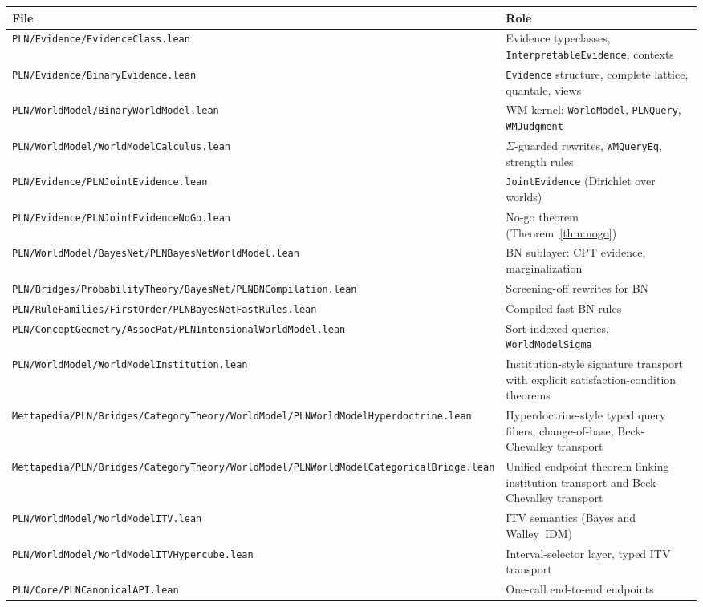 \documentclass[]{article}
\newcommand{\code}[1]{\texttt{#1}}
\begin{document}
\begin{longtable}{p{}p{}}
\hline
\textbf{File} & \textbf{Role} \\ \hline
\endhead
\code{PLN/Evidence/EvidenceClass.lean} & Evidence typeclasses,
  \code{InterpretableEvidence}, contexts \\
\code{PLN/Evidence/BinaryEvidence.lean} & \code{Evidence} structure, complete
  lattice, quantale, views \\
\code{PLN/WorldModel/BinaryWorldModel.lean} & WM kernel: \code{WorldModel},
  \code{PLNQuery}, \code{WMJudgment} \\
\code{PLN/WorldModel/WorldModelCalculus.lean} & $\Sigma$-guarded rewrites,
  \code{WMQueryEq}, strength rules \\
\code{PLN/Evidence/PLNJointEvidence.lean} & \code{JointEvidence} (Dirichlet over
  worlds) \\
\code{PLN/Evidence/PLNJointEvidenceNoGo.lean} & No-go theorem
  (Theorem~\ref{thm:nogo}) \\
\code{PLN/WorldModel/BayesNet/PLNBayesNetWorldModel.lean} & BN sublayer: CPT evidence,
  marginalization \\
\code{PLN/Bridges/ProbabilityTheory/BayesNet/PLNBNCompilation.lean} & Screening-off rewrites for BN \\
\code{PLN/RuleFamilies/FirstOrder/PLNBayesNetFastRules.lean} & Compiled fast BN rules \\
\code{PLN/ConceptGeometry/AssocPat/PLNIntensionalWorldModel.lean} & Sort-indexed queries,
  \code{WorldModelSigma} \\
\code{PLN/WorldModel/WorldModelInstitution.lean} & Institution-style signature
  transport with explicit satisfaction-condition theorems \\
\code{Mettapedia/PLN/Bridges/CategoryTheory/WorldModel/PLNWorldModelHyperdoctrine.lean} & Hyperdoctrine-style typed
  query fibers, change-of-base, Beck-Chevalley transport \\
\code{Mettapedia/PLN/Bridges/CategoryTheory/WorldModel/PLNWorldModelCategoricalBridge.lean} & Unified endpoint
  theorem linking institution transport and Beck-Chevalley transport \\
\code{PLN/WorldModel/WorldModelITV.lean} & ITV semantics (Bayes and
  Walley~IDM) \\
\code{PLN/WorldModel/WorldModelITVHypercube.lean} & Interval-selector layer,
  typed ITV transport \\
\code{PLN/Core/PLNCanonicalAPI.lean} & One-call end-to-end endpoints \\

\end{longtable}
\end{document}
